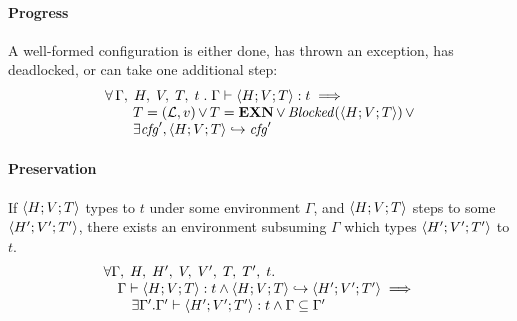 \paragraph{Progress}

A well-formed configuration is either done, has thrown an
exception, has deadlocked, or can take one additional step:
\[
  \begin{array}{l}
    \forall\,\Gamma,\; H,\; V,\; T,\; t \;.\;
    \Gamma \vdash \langle H; V; T\rangle : t \implies \\\qquad
    T = (\mathcal{L}, v) \mathop{\lor}
    T = \textbf{EXN}{} \mathop{\lor}
    \mathit{Blocked}(\langle H; V; T\rangle) \mathop{\lor} \\ \qquad
    \exists \mathit{cfg}', \langle H; V; T\rangle \hookrightarrow \mathit{cfg}'
  \end{array}
\]

\paragraph{Preservation}

If $\langle H; V; T\rangle$ types to $t$ under some environment $\Gamma$,
and $\langle H; V; T\rangle$ steps to some $\langle H'; V'; T'\rangle$, there exists
an environment subsuming $\Gamma$ which types $\langle H'; V'; T'\rangle$
to $t$.
\[
  \begin{array}{l}
    \forall \Gamma,\; H,\; H',\; V,\; V',\; T,\; T',\; t . \\
    \quad \Gamma \vdash \langle H; V; T\rangle : t \land \langle H; V; T\rangle \hookrightarrow \langle H'; V'; T'\rangle \implies\\
    \qquad \exists \Gamma' . \Gamma' \vdash \langle H'; V'; T'\rangle : t \land \Gamma \subseteq \Gamma'
  \end{array}
\]

